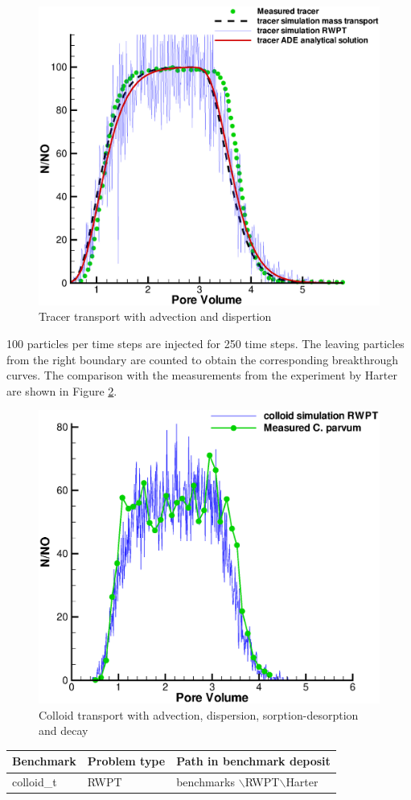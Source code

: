 \begin{figure}[h]
\centering
\includegraphics[scale=0.40]{RWPT/figures/Tracertransport.eps}
\caption{Tracer transport with advection and dispertion}
\label{Tracertransport}
\end{figure}

100 particles per time steps are injected for 250 time steps. The leaving particles from the right boundary are counted to obtain the corresponding breakthrough curves. The comparison with the measurements from the experiment by Harter are shown in Figure \ref{ColloidTransport}.

\begin{figure}[h]
\centering
\includegraphics[scale=0.40]{RWPT/figures/ColloidTransport.eps}
\caption{Colloid transport with advection, dispersion, sorption-desorption and decay}
\label{ColloidTransport}
\end{figure}

\begin{tabular}{|l|l|l|}
\hline
Benchmark & Problem type	& Path in benchmark deposit \\
\hline	
colloid\_t	& RWPT	& benchmarks $\backslash$RWPT$\backslash$Harter \\
\hline	
\end{tabular}
